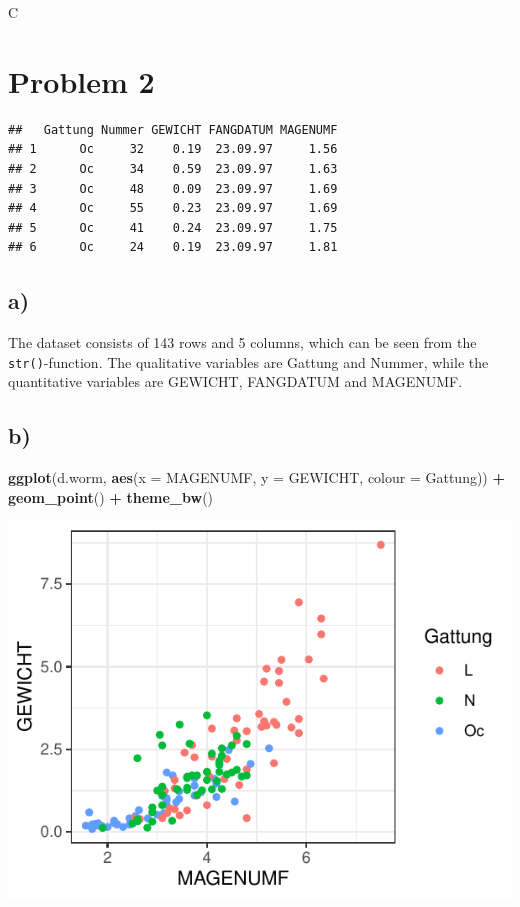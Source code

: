 \documentclass[
]{article}
\newenvironment{Shaded}{\begin{snugshade}}{\end{snugshade}}
\newcommand{\DataTypeTok}[1]{\textcolor[rgb]{0.13,0.29,0.53}{#1}}
\newcommand{\KeywordTok}[1]{\textcolor[rgb]{0.13,0.29,0.53}{\textbf{#1}}}
\newcommand{\NormalTok}[1]{#1}
\newcommand{\OperatorTok}[1]{\textcolor[rgb]{0.81,0.36,0.00}{\textbf{#1}}}
\newcommand{\StringTok}[1]{\textcolor[rgb]{0.31,0.60,0.02}{#1}}
\begin{document}
C

\hypertarget{problem-2}{%
\section{Problem 2}\label{problem-2}}

\begin{verbatim}
##   Gattung Nummer GEWICHT FANGDATUM MAGENUMF
## 1      Oc     32    0.19  23.09.97     1.56
## 2      Oc     34    0.59  23.09.97     1.63
## 3      Oc     48    0.09  23.09.97     1.69
## 4      Oc     55    0.23  23.09.97     1.69
## 5      Oc     41    0.24  23.09.97     1.75
## 6      Oc     24    0.19  23.09.97     1.81
\end{verbatim}

\hypertarget{a-1}{%
\subsection{a)}\label{a-1}}

The dataset consists of 143 rows and 5 columns, which can be seen from
the \texttt{str()}-function. The qualitative variables are Gattung and
Nummer, while the quantitative variables are GEWICHT, FANGDATUM and
MAGENUMF.

\hypertarget{b-1}{%
\subsection{b)}\label{b-1}}

\begin{Shaded}
\begin{Highlighting}[]
\KeywordTok{ggplot}\NormalTok{(d.worm, }\KeywordTok{aes}\NormalTok{(}\DataTypeTok{x =}\NormalTok{ MAGENUMF, }\DataTypeTok{y =}\NormalTok{ GEWICHT, }\DataTypeTok{colour =}\NormalTok{ Gattung)) }\OperatorTok{+}\StringTok{ }\KeywordTok{geom_point}\NormalTok{() }\OperatorTok{+}\StringTok{ }
\StringTok{    }\KeywordTok{theme_bw}\NormalTok{()}
\end{Highlighting}
\end{Shaded}

\includegraphics{Project_1_files/figure-latex/unnamed-chunk-3-1.pdf}
\end{document}
